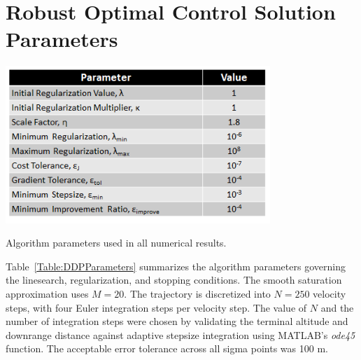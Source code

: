 \section{Robust Optimal Control Solution Parameters}
\begin{table}[h!]
	\centering
	\includegraphics[width=0.75\textwidth]{Images/DDP_Parameters}
	\caption{Algorithm parameters used in all numerical results.}
	\label{Table:DDPParameters}
\end{table}
Table~\ref{Table:DDPParameters} summarizes the algorithm parameters governing the linesearch, regularization, and stopping conditions. 
The smooth saturation approximation uses $M = 20$. The trajectory is discretized into $ N=250 $ velocity steps, with four Euler integration steps per velocity step. The value of $ N $ and the number of integration steps were chosen by validating the terminal altitude and downrange distance against adaptive stepsize integration using MATLAB's \textit{ode45} function. The acceptable error tolerance across all sigma points was 100 m.

